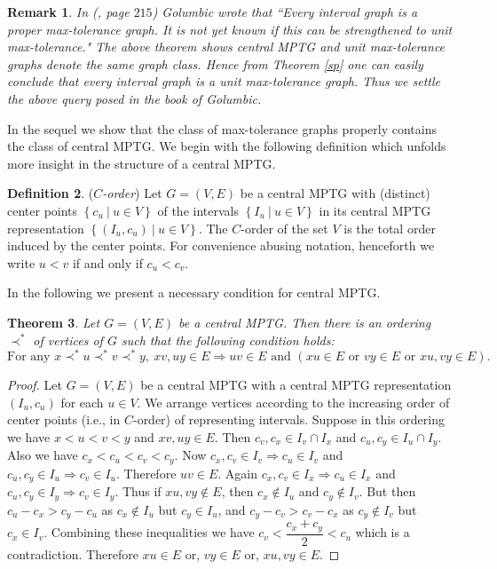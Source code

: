 \documentclass{article}
\newtheorem{thm}{Theorem}[section]
\newtheorem{rmk}[thm]{Remark}
\theoremstyle{definition}
\newtheorem{defn}[thm]{Definition}
\numberwithin{equation}{section}
\newcommand{\set}[1]{\left\{#1\right\}}
\newcommand{\Set}[2]{\set{#1\ \vert\ #2}}
\begin{document}
\begin{rmk}
{\em In (\cite{Golumbic2}, page $215$) Golumbic wrote that ``Every interval graph is a proper max-tolerance graph. It is not yet known if this can be strengthened to unit max-tolerance." The above theorem shows central MPTG and unit max-tolerance graphs denote the same graph class. Hence from Theorem \ref{sp} one can easily conclude that every interval graph is a unit max-tolerance graph. Thus we settle the above query posed in the book of Golumbic.}
\end{rmk}

\noindent
In the sequel we show that the class of max-tolerance graphs properly contains the class of central MPTG. We begin with the following definition which unfolds more insight in the structure of a central MPTG.



\begin{defn}
(\textit{$C$-order})
Let $G=(V,E)$ be a central MPTG with (distinct) center points $\Set{c_{u}}{u\in V}$ of the intervals $\Set{I_{u}}{u\in V}$ in its central MPTG representation $\Set{(I_{u},c_{u})}{u\in V}$. The $C$-order of the set $V$ is the total order induced by the center points. For convenience abusing notation, henceforth we write $u < v$ if and only if $c_{u}<c_{v}$. 
\end{defn}

\noindent In the following we present a necessary condition for central MPTG.

\begin{thm}\label{4pt}
Let $G=(V,E)$ be a central MPTG. Then there is an ordering $\prec^{*}$ of vertices of $G$ such that the following condition holds:
\begin{equation}\label{cmptg1}
\text{For any } x\prec^{*}u\prec^{*}v\prec^{*}y,\ xv,uy\in E \Longrightarrow uv\in E \text{ and } (xu\in E \text{ or } vy\in E \text{ or } xu,vy\in E).
\end{equation}
\end{thm}

\begin{proof}
Let $G=(V,E)$ be a central MPTG with a central MPTG representation $(I_{u},c_{u})$ for each $u\in V$. We arrange vertices according to the increasing order of center points (i.e., in $C$-order) of representing intervals. Suppose in this ordering we have $x<u<v<y$ and $xv,uy\in E$. Then $c_{v},c_{x}\in I_{v}\cap I_{x}$ and $c_{u},c_{y}\in I_{u}\cap I_{y}$. Also we have $c_{x}<c_{u}<c_{v}<c_{y}$. Now $c_{x},c_{v}\in I_{v}\Rightarrow c_{u}\in I_{v}$ and $c_{u},c_{y}\in I_{u} \Rightarrow c_{v}\in I_{u}$. Therefore $uv\in E$. Again $c_{x},c_{v}\in I_{x} \Rightarrow c_{u}\in I_{x}$ and $c_{u},c_{y}\in I_{y}\Rightarrow c_{v}\in I_{y}$. Thus if $xu,vy \notin E$, then $c_{x} \notin I_{u}$ and $c_{y} \notin I_{v}$. But then $c_{u}-c_{x}>c_{y}-c_{u}$ as $c_{x} \notin I_{u}$ but $c_{y}\in I_{u}$, and $c_{y}-c_{v}>c_{v}-c_{x}$ as $c_{y}\notin I_{v}$ but $c_{x}\in I_{v}$. Combining these inequalities we have $c_{v}<\dfrac{c_{x}+c_{y}}{2}<c_{u}$ which is a contradiction. Therefore $xu\in E$ or, $vy\in E$ or, $xu,vy\in E$.
\end{proof}
\end{document}
